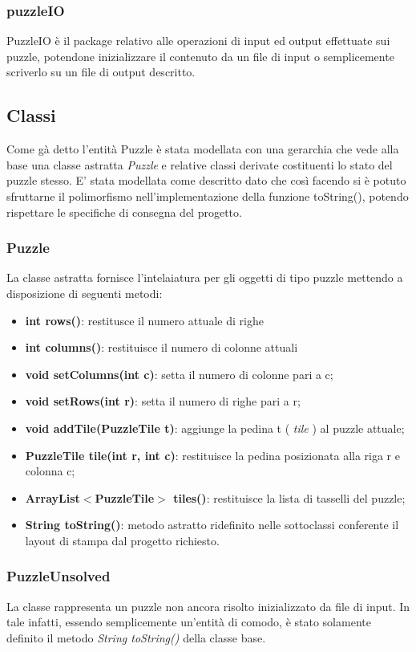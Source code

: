\documentclass[11pt]{article}
\begin{document}
\subsubsection{puzzleIO}
PuzzleIO è il package relativo alle operazioni di input ed output effettuate sui puzzle, potendone inizializzare il contenuto da un file di input o semplicemente scriverlo su un file di output descritto.
\subsection{Classi}
Come gà detto l'entità Puzzle è stata modellata con una gerarchia che vede alla base una classe astratta \textit{Puzzle} e relative classi derivate costituenti lo stato del puzzle stesso. E' stata modellata come descritto dato che così facendo si è potuto sfruttarne il polimorfismo nell'implementazione della funzione toString(), potendo rispettare le specifiche di consegna del progetto.
\subsubsection{Puzzle}
La classe astratta fornisce l'intelaiatura per gli oggetti di tipo puzzle mettendo a disposizione di seguenti metodi:
\begin{itemize}
    \item \textbf{int rows()}: restitusce il numero attuale di righe
    \item \textbf{int columns()}: restituisce il numero di colonne attuali
    \item \textbf{void setColumns(int c)}: setta il numero di colonne pari a c;
    \item \textbf{void setRows(int r)}: setta il numero di righe pari a r;
    \item \textbf{void addTile(PuzzleTile t)}: aggiunge la pedina t  ( \textit{tile} ) al puzzle attuale;
    \item \textbf{PuzzleTile tile(int r, int c)}: restituisce la pedina posizionata alla riga r e colonna c;
    \item \textbf{ArrayList$<$PuzzleTile$>$ tiles()}: restituisce la lista di tasselli del puzzle;
    \item \textbf{String toString()}: metodo astratto ridefinito nelle sottoclassi conferente il layout di stampa dal progetto richiesto.
\end{itemize}
\subsubsection{PuzzleUnsolved}
La classe rappresenta un puzzle non ancora risolto inizializzato da file di input. In tale infatti, essendo semplicemente un'entità di comodo, è stato solamente definito il metodo \textit{String toString()} della classe base.
\end{document}
